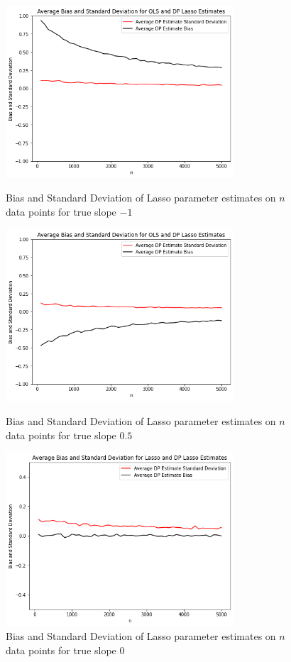 \documentclass[11pt,conference]{IEEEtran}
\begin{document}
\begin{figure}[htbp]
\centerline{\includegraphics[width=8.5cm]{plots/lasso_-1.png}}
\caption{Bias and Standard Deviation of Lasso parameter estimates on $n$ data points for true slope $-1$} \bigskip
\centerline{\includegraphics[width=8.5cm]{plots/lasso_0.5.png}}
\caption{Bias and Standard Deviation of Lasso parameter estimates on $n$ data points for true slope $0.5$}
\centerline{\includegraphics[width=8.5cm]{plots/lasso_0.png}}
\caption{Bias and Standard Deviation of Lasso parameter estimates on $n$ data points for true slope $0$}
\label{fig}
\end{figure}
\end{document}

